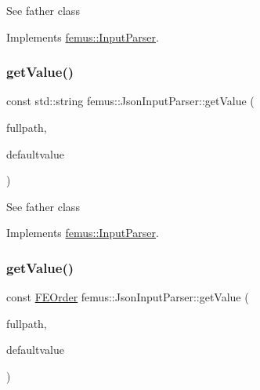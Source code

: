 See father class 

Implements \mbox{\hyperlink{classfemus_1_1_input_parser_a8feee424de84c28d6689361e22769ed1}{femus\+::\+Input\+Parser}}.

\mbox{\label{classfemus_1_1_json_input_parser_af9cad72e2f40793edb81d8136342cf40}} 
\subsubsection{\texorpdfstring{get\+Value()}{getValue()}\hspace{0.1cm}{\footnotesize\ttfamily [4/6]}}
{\footnotesize\ttfamily const std\+::string femus\+::\+Json\+Input\+Parser\+::get\+Value (\begin{DoxyParamCaption}\item[{const std\+::string \&}]{fullpath,  }\item[{const std\+::string}]{defaultvalue }\end{DoxyParamCaption})\hspace{0.3cm}{\ttfamily [virtual]}}

See father class 

Implements \mbox{\hyperlink{classfemus_1_1_input_parser_afc1cace4dae0ea2878d1ddd586dc6a2e}{femus\+::\+Input\+Parser}}.

\mbox{\label{classfemus_1_1_json_input_parser_a29fe53a616bd9326081bfa485fc7b455}} 
\subsubsection{\texorpdfstring{get\+Value()}{getValue()}\hspace{0.1cm}{\footnotesize\ttfamily [5/6]}}
{\footnotesize\ttfamily const \mbox{\hyperlink{_f_elem_type_enum_8hpp_a00ea9562f0dbb25e22bb3297d596e3ba}{F\+E\+Order}} femus\+::\+Json\+Input\+Parser\+::get\+Value (\begin{DoxyParamCaption}\item[{const std\+::string \&}]{fullpath,  }\item[{const \mbox{\hyperlink{_f_elem_type_enum_8hpp_a00ea9562f0dbb25e22bb3297d596e3ba}{F\+E\+Order}}}]{defaultvalue }\end{DoxyParamCaption})\hspace{0.3cm}{\ttfamily [virtual]}}

